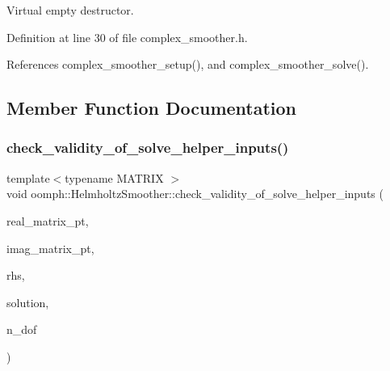 Virtual empty destructor. 



Definition at line 30 of file complex\+\_\+smoother.\+h.



References complex\+\_\+smoother\+\_\+setup(), and complex\+\_\+smoother\+\_\+solve().



\subsection{Member Function Documentation}
\mbox{\label{classoomph_1_1HelmholtzSmoother_a10dbef9689095e84e92f6864938850f7}} 
\subsubsection{\texorpdfstring{check\+\_\+validity\+\_\+of\+\_\+solve\+\_\+helper\+\_\+inputs()}{check\_validity\_of\_solve\_helper\_inputs()}}
{\footnotesize\ttfamily template$<$typename M\+A\+T\+R\+IX $>$ \\
void oomph\+::\+Helmholtz\+Smoother\+::check\+\_\+validity\+\_\+of\+\_\+solve\+\_\+helper\+\_\+inputs (\begin{DoxyParamCaption}\item[{\hyperlink{classoomph_1_1CRDoubleMatrix}{C\+R\+Double\+Matrix} $\ast$const \&}]{real\+\_\+matrix\+\_\+pt,  }\item[{\hyperlink{classoomph_1_1CRDoubleMatrix}{C\+R\+Double\+Matrix} $\ast$const \&}]{imag\+\_\+matrix\+\_\+pt,  }\item[{const \hyperlink{classoomph_1_1Vector}{Vector}$<$ \hyperlink{classoomph_1_1DoubleVector}{Double\+Vector} $>$ \&}]{rhs,  }\item[{\hyperlink{classoomph_1_1Vector}{Vector}$<$ \hyperlink{classoomph_1_1DoubleVector}{Double\+Vector} $>$ \&}]{solution,  }\item[{const double \&}]{n\+\_\+dof }\end{DoxyParamCaption})}




